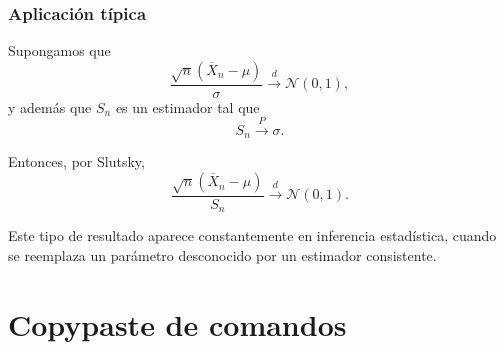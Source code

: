 \subsubsection*{Aplicación típica}

Supongamos que
\[
\frac{\sqrt{n}(\overline{X}_n-\mu)}{\sigma}
\xrightarrow{d}
\mathcal{N}(0,1),
\]
y además que $S_n$ es un estimador tal que
\[
S_n\xrightarrow{P}\sigma.
\]

Entonces, por Slutsky,
\[
\frac{\sqrt{n}(\overline{X}_n-\mu)}{S_n}
\xrightarrow{d}
\mathcal{N}(0,1).
\]

Este tipo de resultado aparece constantemente en inferencia estadística, cuando se reemplaza un parámetro desconocido por un estimador consistente.

\section{Copypaste de comandos}

